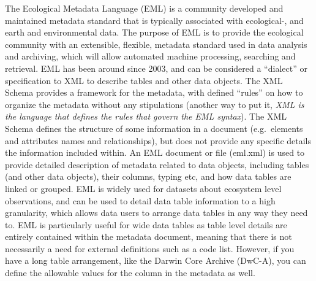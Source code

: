 \documentclass[
]{book}
\begin{document}
The Ecological Metadata Language (EML) is a community developed and maintained metadata standard that is typically associated with ecological-, and earth and environmental data. The purpose of EML is to provide the ecological community with an extensible, flexible, metadata standard used in data analysis and archiving, which will allow automated machine processing, searching and retrieval. EML has been around since 2003, and can be considered a ``dialect'' or specification to XML to describe tables and other data objects. The XML Schema provides a framework for the metadata, with defined ``rules'' on how to organize the metadata without any stipulations (another way to put it, \emph{XML is the language that defines the rules that govern the EML syntax}). The XML Schema defines the structure of some information in a document (e.g.~elements and attributes names and relationships), but does not provide any specific details the information included within. An EML document or file (eml.xml) is used to provide detailed description of metadata related to data objects, including tables (and other data objects), their columns, typing etc, and how data tables are linked or grouped. EML is widely used for datasets about ecosystem level observations, and can be used to detail data table information to a high granularity, which allows data users to arrange data tables in any way they need to. EML is particularly useful for wide data tables as table level details are entirely contained within the metadata document, meaning that there is not necessarily a need for external definitions such as a code list. However, if you have a long table arrangement, like the Darwin Core Archive (DwC-A), you can define the allowable values for the column in the metadata as well.
\end{document}
